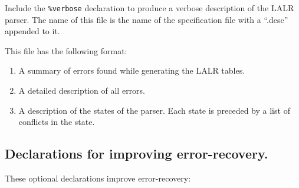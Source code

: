\documentclass{article}
\begin{document}
\begin{description}
Include the {\tt \%verbose} declaration to produce a verbose
description of the LALR parser.   The name of this file is
the name of the specification file with a ``.desc'' appended to it.

     This file has the following format:
\begin{enumerate}

\item A summary of errors found while generating the LALR tables.
\item A detailed description of all errors.
\item A description of the states of the parser.  Each state
        is preceded by a list of conflicts in the state.

\end{enumerate}
\end{description}

\subsection{Declarations for improving error-recovery.}

These optional declarations improve error-recovery:
\end{document}
